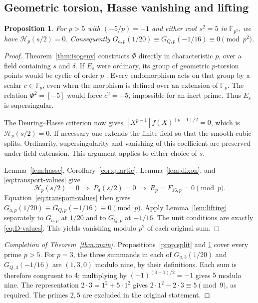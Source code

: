 \documentclass[11pt,a4paper]{article}
\newtheorem{proposition}[theorem]{Proposition}
\theoremstyle{remark}
\newcommand{\Fp}{\mathbb F_p}
\newcommand{\Fpp}{\mathbb F_{p^2}}
\begin{document}
\subsection{Geometric torsion, Hasse vanishing and lifting}
\begin{proposition}\label{prop:inert}
For $p>5$ with $(-5/p)=-1$ and either root $s^2=5$ in $\Fpp$,
we have $\mathcal H_p(s/2)=0$. Consequently
$G_{a,p}(1/20)\equiv G_{Q,p}(-1/16)\equiv0\pmod{p^2}$.
\end{proposition}
\begin{proof}
Theorem~\ref{thm:isogeny} constructs $\Phi$ directly in
characteristic $p$, over a field containing $s$ and $\delta$.
If $E_s$ were ordinary, its group of geometric $p$-torsion points
would be cyclic of order $p$ \cite[p.~1]{suth13}. Every
endomorphism acts on that group by a scalar $c\in\Fp$, even when
the morphism is defined over an extension of $\Fp$. The relation
$\Phi^2=[-5]$ would force $c^2=-5$, impossible for an inert prime.
Thus $E_s$ is supersingular.

The Deuring--Hasse criterion \cite[p.~1]{debry} now gives
$[X^{p-1}]f(X)^{(p-1)/2}=0$, which is $\mathcal H_p(s/2)=0$.
If necessary one extends the finite field so that the smooth cubic
splits. Ordinarity, supersingularity and vanishing of this coefficient
are preserved under field extension. This argument applies to either
choice of $s$.

Lemma~\ref{lem:hasse}, Corollary~\ref{cor:quartic},
Lemma~\ref{lem:dixon}, and \eqref{eq:transport-values} give
\[
 \mathcal H_p(s/2)=0\ \Longrightarrow\ P_d(s/2)=0
 \ \Longrightarrow\ R_p=F_{16,p}=0\pmod p.
\]
Equation~\eqref{eq:transport-values} then gives
$G_{a,p}(1/20)\equiv G_{Q,p}(-1/16)\equiv0\pmod p$.
Apply Lemma~\ref{lem:lifting} separately to $G_{a,p}$ at $1/20$
and to $G_{Q,p}$ at $-1/16$. The unit conditions are exactly
\eqref{eq:D-values}. This yields vanishing modulo $p^2$ of each
original sum.
\end{proof}

\begin{proof}[Completion of Theorem~\ref{thm:main}]
Propositions~\ref{prop:split} and \ref{prop:inert} cover every
prime $p>5$. For $p=3$, the three summands in each of
$G_{a,3}(1/20)$ and $G_{Q,3}(-1/16)$ are $(1,3,0)$ modulo nine,
by their definitions. Each sum is therefore congruent to $4$;
multiplying by $(-1)^{(3-1)/2}=-1$ gives $5$ modulo nine.
The representation $2\cdot3=1^2+5\cdot1^2$ gives
$2\cdot1^2-2\cdot3\equiv5\pmod9$, as required.
The primes $2,5$ are excluded in the original statement.
\end{proof}
\end{document}
